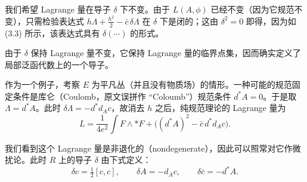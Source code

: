 
我们希望 Lagrange 量在导子 $\delta$ 下不变。由于 $L(A,\phi)$ 已经不变（因为它规范不变），只需检验表达式 $h\Lambda+\frac{h^2}{2}-\bar c\,\delta\Lambda$ 在 $\delta$ 下是闭的；这由 $\delta^2=0$ 即得，因为如 (3.3) 所示，该表达式具有 $\delta(\cdots)$ 的形式。

由于 $\delta$ 保持 Lagrange 量不变，它保持 Lagrange 量的临界点集，因而确实定义了局部泛函代数上的一个导子。

作为一个例子，考察 $E$ 为平凡丛（并且没有物质场）的情形。一种可能的规范固定条件是库仑（Coulomb，原文误拼作 “Coloumb”）规范条件 $d^*A=0$。于是取 $\Lambda=d^*A$。此时 $\delta\Lambda=-d^*d_Ac$，故消去 $h$ 之后，纯规范理论的 Lagrange 量为
\begin{equation}
  \tag{3.4}
  \label{eq:3-4}
  L=\frac{1}{4e^2}\int F\wedge *F+\bigl((d^*A)^2-\bar c\,d^*d_Ac\bigr).
\end{equation}

我们看到这个 Lagrange 量是非退化的（nondegenerate），因此可以照常对它作微扰论。此时 $R$ 上的导子 $\delta$ 由下式定义：
\begin{equation}
  \tag{3.5}
  \label{eq:3-5}
  \delta c=\tfrac12[c,c],\qquad \delta A=-d_Ac,\qquad \delta\bar c=-d^*A.
\end{equation}


